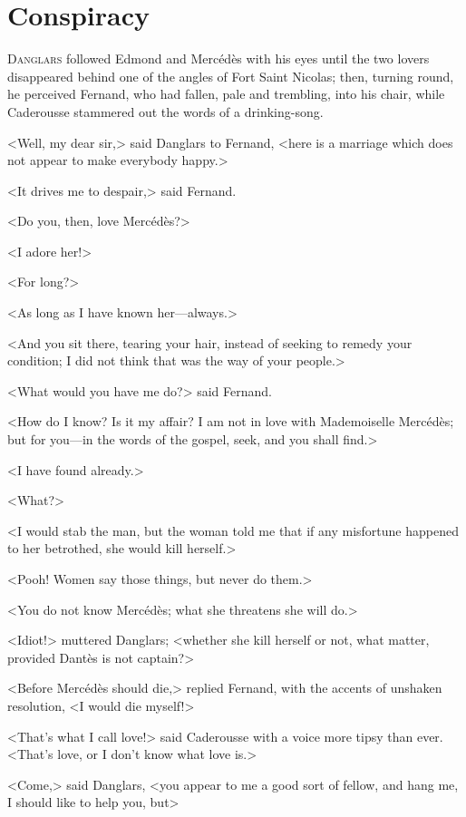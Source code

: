 \chapter{Conspiracy} 

 \lettrine{D}{anglars} followed Edmond and Mercédès with his eyes until the two lovers disappeared behind one of the angles of Fort Saint Nicolas; then, turning round, he perceived Fernand, who had fallen, pale and trembling, into his chair, while Caderousse stammered out the words of a drinking-song. 

 <Well, my dear sir,> said Danglars to Fernand, <here is a marriage which does not appear to make everybody happy.> 

 <It drives me to despair,> said Fernand. 

 <Do you, then, love Mercédès?> 

 <I adore her!> 

 <For long?> 

 <As long as I have known her—always.> 

 <And you sit there, tearing your hair, instead of seeking to remedy your condition; I did not think that was the way of your people.> 

 <What would you have me do?> said Fernand. 

 <How do I know? Is it my affair? I am not in love with Mademoiselle Mercédès; but for you—in the words of the gospel, seek, and you shall find.> 

 <I have found already.> 

 <What?> 

 <I would stab the man, but the woman told me that if any misfortune happened to her betrothed, she would kill herself.> 

 <Pooh! Women say those things, but never do them.> 

 <You do not know Mercédès; what she threatens she will do.> 

 <Idiot!> muttered Danglars; <whether she kill herself or not, what matter, provided Dantès is not captain?> 

 <Before Mercédès should die,> replied Fernand, with the accents of unshaken resolution, <I would die myself!> 

 <That's what I call love!> said Caderousse with a voice more tipsy than ever. <That's love, or I don't know what love is.> 

 <Come,> said Danglars, <you appear to me a good sort of fellow, and hang me, I should like to help you, but\longdash> 


